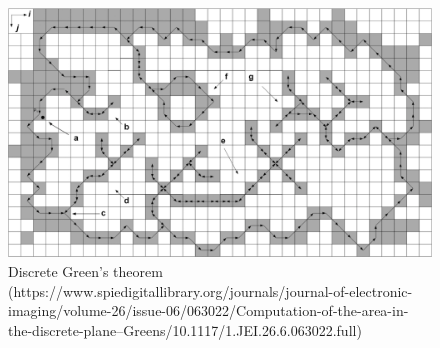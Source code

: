 \documentclass[11pt,English]{article}
\begin{document}
\begin{figure}
    \centering
    \includegraphics[scale=0.8]{polyominoes.png}
    \caption{Discrete Green's theorem 
    (https://www.spiedigitallibrary.org/journals/journal-of-electronic-imaging/volume-26/issue-06/063022/Computation-of-the-area-in-the-discrete-plane--Greens/10.1117/1.JEI.26.6.063022.full)}
    \label{fig:my_label}
\end{figure}
\end{document}
